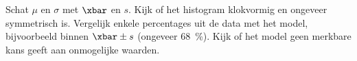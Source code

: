 \begin{werkwijze}
Schat $\mu$ en $\sigma$ met $\xbar$ en $s$. Kijk of het histogram klokvormig en ongeveer symmetrisch is. Vergelijk enkele percentages uit de data met het model, bijvoorbeeld binnen $\xbar \pm s$ (ongeveer 68~\%). Kijk of het model geen merkbare kans geeft aan onmogelijke waarden.
\end{werkwijze}

\begin{oefeningen}


\end{oefeningen}

\opdrachtenkop

\begin{oefeningen}

























\end{oefeningen}

